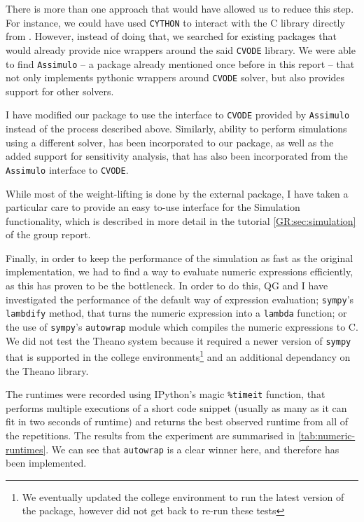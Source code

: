There is more than one approach that would have allowed us to reduce this step. For instance, we could have used \verb"CYTHON"\cite{behnel2010cython} to interact with the C library directly from \python{}. 
However, instead of doing that, we searched for existing \python{} packages that would already provide nice \python{} wrappers around the said \verb"CVODE" library. We were able to find \verb"Assimulo" -- a package already mentioned once before in this report -- that not only implements pythonic wrappers around \verb"CVODE" solver, but also provides support for other solvers.

I have modified our package to use the interface to \verb"CVODE" provided by \verb"Assimulo" instead of the process described above. 
Similarly, ability to perform simulations using a different solver, has been incorporated to our package, as well as the added support for sensitivity analysis, that has also been incorporated from the \verb"Assimulo" interface to \verb"CVODE". 

While most of the weight-lifting is done by the external package, I have taken a particular care to provide an easy to-use interface for the Simulation functionality, which is described in more detail in the tutorial \autoref*{GR:sec:simulation} of the group report.

Finally, in order to keep the performance of the simulation as fast as the original implementation, we had to find a way to evaluate numeric expressions efficiently, as this has proven to be the bottleneck. 
In order to do this, QG and I have investigated the performance of the default way of expression evaluation; \verb"sympy"'s \verb"lambdify" method, that turns the numeric expression into a \verb"lambda" function; or the use of \verb"sympy"'s \verb"autowrap" module which compiles the numeric expressions to C. 
We did not test the Theano\cite{bergstra_theano:_2010} system because it required a newer version of \verb"sympy" that is supported in the college environments\footnote{We eventually updated the college environment to run the latest version of the package, however did not get back to re-run these tests} and an additional dependancy on the Theano library. 

The runtimes were recorded using IPython's\cite{perez_ipython:_2007} magic \verb"%timeit" 
function, that performs multiple executions of a short code snippet (usually as many as it can fit in two seconds of runtime) and returns the best observed runtime from all of the repetitions.
The results from the experiment are summarised in \autoref{tab:numeric-runtimes}. 
We can see that \verb"autowrap" is a clear winner here, and therefore has been implemented.

